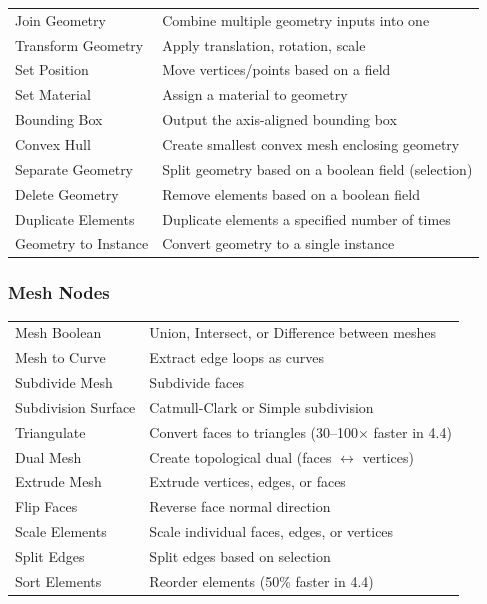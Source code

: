 \begin{center}
\begin{tabularx}{\textwidth}{L{4cm}X}
\toprule
{}
 &  \\
\midrule
Join Geometry & Combine multiple geometry inputs into one \\
Transform Geometry & Apply translation, rotation, scale \\
Set Position & Move vertices/points based on a field \\
Set Material & Assign a material to geometry \\
Bounding Box & Output the axis-aligned bounding box \\
Convex Hull & Create smallest convex mesh enclosing geometry \\
Separate Geometry & Split geometry based on a boolean field (selection) \\
Delete Geometry & Remove elements based on a boolean field \\
Duplicate Elements & Duplicate elements a specified number of times \\
Geometry to Instance & Convert geometry to a single instance \\
\bottomrule
\end{tabularx}
\end{center}

\subsubsection{Mesh Nodes}

\begin{center}
\begin{tabularx}{\textwidth}{L{4cm}X}
\toprule
{}
 &  \\
\midrule
Mesh Boolean & Union, Intersect, or Difference between meshes \\
Mesh to Curve & Extract edge loops as curves \\
Subdivide Mesh & Subdivide faces \\
Subdivision Surface & Catmull-Clark or Simple subdivision \\
Triangulate & Convert faces to triangles (30--100$\times$ faster in 4.4) \\
Dual Mesh & Create topological dual (faces $\leftrightarrow$ vertices) \\
Extrude Mesh & Extrude vertices, edges, or faces \\
Flip Faces & Reverse face normal direction \\
Scale Elements & Scale individual faces, edges, or vertices \\
Split Edges & Split edges based on selection \\
Sort Elements & Reorder elements (50\% faster in 4.4) \\
\bottomrule
\end{tabularx}
\end{center}

